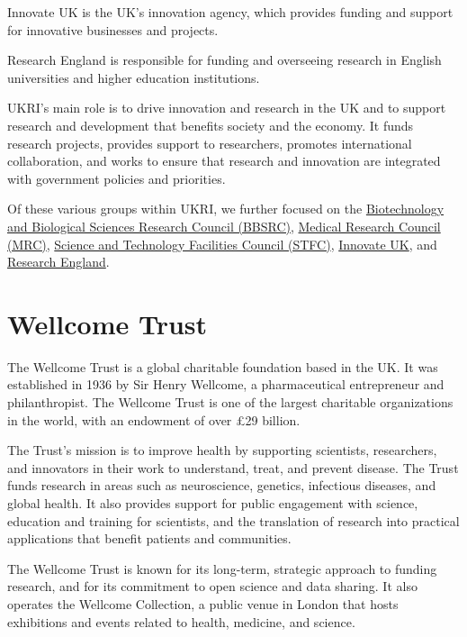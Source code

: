 \documentclass[
]{book}
\begin{document}
Innovate UK is the UK's innovation agency, which provides funding and support for innovative businesses and projects.

Research England is responsible for funding and overseeing research in English universities and higher education institutions.

UKRI's main role is to drive innovation and research in the UK and to support research and development that benefits society and the economy. It funds research projects, provides support to researchers, promotes international collaboration, and works to ensure that research and innovation are integrated with government policies and priorities.

Of these various groups within UKRI, we further focused on the \href{https://www.ukri.org/councils/bbsrc/}{Biotechnology and Biological Sciences Research Council (BBSRC)}, \href{https://www.ukri.org/councils/mrc/}{Medical Research Council (MRC)}, \href{https://www.ukri.org/councils/stfc/}{Science and Technology Facilities Council (STFC)}, \href{https://www.ukri.org/councils/innovate-uk/}{Innovate UK}, and \href{https://www.ukri.org/councils/research-england/}{Research England}.

\hypertarget{wellcome}{%
\section{Wellcome Trust}\label{wellcome}}

The Wellcome Trust is a global charitable foundation based in the UK. It was established in 1936 by Sir Henry Wellcome, a pharmaceutical entrepreneur and philanthropist. The Wellcome Trust is one of the largest charitable organizations in the world, with an endowment of over £29 billion.

The Trust's mission is to improve health by supporting scientists, researchers, and innovators in their work to understand, treat, and prevent disease. The Trust funds research in areas such as neuroscience, genetics, infectious diseases, and global health. It also provides support for public engagement with science, education and training for scientists, and the translation of research into practical applications that benefit patients and communities.

The Wellcome Trust is known for its long-term, strategic approach to funding research, and for its commitment to open science and data sharing. It also operates the Wellcome Collection, a public venue in London that hosts exhibitions and events related to health, medicine, and science.
\end{document}
